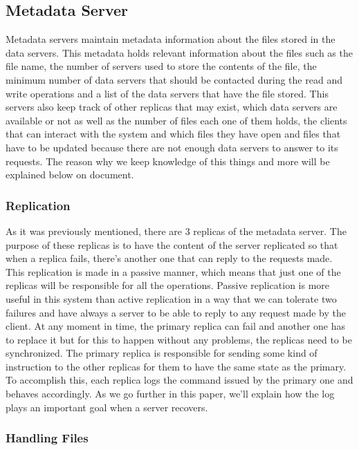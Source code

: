 \subsection{Metadata Server}

Metadata servers maintain metadata information about the files stored
in the data servers. This metadata holds relevant information about
the files such as the file name, the number of servers used to store
the contents of the file, the minimum number of data servers that should
be contacted during the read and write operations and a list of the
data servers that have the file stored. This servers also keep track of
other replicas that may exist, which data servers are available or not as
well as the number of files each one of them holds, the clients that can
interact with the system and which files they have open and files that have
to be updated because there are not enough data servers to answer to its
requests. The reason why we keep knowledge of this things and more
will be explained below on document.

\subsubsection{Replication}

As it was previously mentioned, there are 3 replicas of the metadata
server. The purpose of these replicas is to have the content of the
server replicated so that when a replica fails, there's another one
that can reply to the requests made. This replication is made in a
passive manner, which means that just one of the replicas will be
responsible for all the operations. Passive replication
is more useful in this system than active replication in a way that we
can tolerate two failures and have always a server to be able to reply to
any request made by the client. At any moment in time, the primary replica
can fail and another one has to replace it but for this to happen without
any problems, the replicas need to be synchronized. The primary replica is
responsible for sending some kind of instruction to the other replicas for
them to have the same state as the primary. To accomplish this, each replica
logs the command issued by the primary one and behaves accordingly. As we
go further in this paper, we'll explain how the log plays an important goal
when a server recovers.

\subsubsection{Handling Files}

